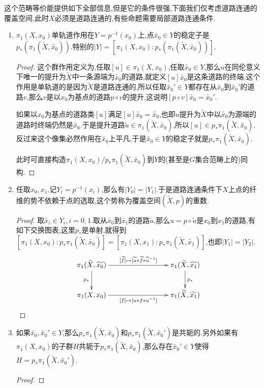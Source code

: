 这个范畴等价能提供如下全部信息,但是它的条件很强,下面我们仅考虑道路连通的覆盖空间,此时$X$必须是道路连通的,有些命题需要局部道路连通条件.
\begin{enumerate}
	\item $\pi_1(X,x_0)$单轨道作用在$Y=p^{-1}(x_0)$上,点$\widetilde{x_0}\in Y$的稳定子是$p_*(\pi_1(\widetilde{X},\widetilde{x_0}))$.特别的$|Y|=[\pi_1(X,x_0):p_*(\pi_1(\widetilde{X},\widetilde{x_0}))]$.
	\begin{proof}
		
		这个群作用定义为,任取$[u]\in\pi_1(X,x_0)$,任取$\widetilde{x_0}\in Y$,那么$u$在同伦意义下唯一的提升为$\widetilde{X}$中一条源端为$\widetilde{x_0}$的道路,就定义$[u]\widetilde{x_0}$是这条道路的终端.这个作用是单轨道的是因为$\widetilde{X}$是道路连通的,所以任取$\widetilde{x_0}'\in Y$都存在从$\widetilde{x_0}$到$\widetilde{x_0}'$的道路$v$,那么$v$是以$x_0$为基点的道路$p\circ v$的提升,这说明$[p\circ v]\widetilde{x_0}=\widetilde{x_0}'$.
		
		\qquad
		
		如果以$x_0$为基点的道路类$[u]$满足$[u]\widetilde{x_0}=\widetilde{x_0}$,也即$u$提升为$\widetilde{X}$中以$\widetilde{x_0}$为源端的道路时终端仍然是$\widetilde{x_0}$.于是提升道路$\widetilde{u}\in\pi_1(\widetilde{X},\widetilde{x_0})$,所以$[u]\in p_*\pi_1(\widetilde{X},\widetilde{x_0})$.反过来这个像集必然作用在$\widetilde{x_0}$上平凡,于是$\widetilde{x_0}\in Y$的稳定子就是$p_*\pi_1(\widetilde{X},\widetilde{x_0})$.
		
		\qquad
		
		此时可直接构造$\pi_1(X,x_0)/p_*\pi_1(\widetilde{X},\widetilde{x_0})$到$Y$的(甚至是$G$集合范畴上的)同构.
	\end{proof}
	\item 任取$x_0,x_1$,记$Y_i=p^{-1}(x_i)$,那么有$|Y_0|=|Y_1|$.于是道路连通条件下$X$上点的纤维的势不依赖于点的选取,这个势称为覆盖空间$(\widetilde{X},p)$的重数.
	\begin{proof}
		
		取$\widetilde{x_i}\in Y_i,i=0,1$.取从$\widetilde{x_0}$到$\widetilde{x_1}$的道路$\widetilde{u}$,那么$u=p\circ\widetilde{u}$是$x_0$到$x_1$的道路,有如下交换图表,这里$p_*$是单射,就得到$[\pi_1(X,x_0):p_*\pi_1(\widetilde{X},\widetilde{x_0})]=[\pi_1(X,x_1):p_*\pi_1(\widetilde{X},\widetilde{x_1})]$,也即$|Y_1|=|Y_2|$.
		$$\xymatrix{\pi_1(\widetilde{X},\widetilde{x_0})\ar[rrr]^{[\widetilde{f}]\mapsto[\widetilde{u}\ast\widetilde{f}\ast\widetilde{u}^{-1}]}\ar[d]_{p_*}&&&\pi_1(\widetilde{X},\widetilde{x_1})\ar[d]^{p_*}\\\pi_1(X,x_0)\ar[rrr]_{[f]\mapsto[u\ast f\ast u^{-1}]}&&&\pi_1(\widetilde{X},\widetilde{x_1})}$$
	\end{proof}
	\item 如果$\widetilde{x_0},\widetilde{x_0}'\in Y$,那么$p_*\pi_1(\widetilde{X},\widetilde{x_0})$和$p_*\pi_1(\widetilde{X},\widetilde{x_0}')$是共轭的.另外如果有$\pi_1(X,x_0)$的子群$H$共轭于$p_*\pi_1(\widetilde{X},\widetilde{x_0})$,那么存在$\widetilde{x_0}'\in Y$使得$H=p_*\pi_1(\widetilde{X},\widetilde{x_0}')$.
	\begin{proof}
		

\end{proof}
\end{enumerate}
